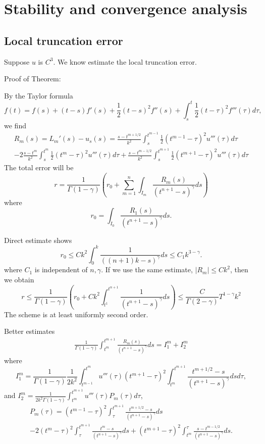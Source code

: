 \documentclass[11pt]{article} %
\begin{document}
\section{Stability and convergence analysis}


\subsection{Local truncation error}
Suppose $u$ is $C^3$. We know estimate the local truncation error.

Proof of Theorem:

By the Taylor formula $$
f(t)=f(s)+(t-s)f'(s)+\frac{1}{2}(t-s)^2f''(s)+\int_s^t\frac{1}{2}(t-\tau)^2 f'''(\tau)d\tau,
$$
we find 
\begin{multline}
R_m(s)=L_m'(s)-u_s(s)=\frac{s-t^{m+1/2}}{k^2}\int_s^{t^{m-1}}\frac{1}{2}(t^{m-1}-\tau)^2 u'''(\tau)d\tau\\
-2\frac{s-t^m}{k^2}\int_s^{t^m}\frac{1}{2}(t^m-\tau)^2 u'''(\tau)d\tau
+\frac{s-t^{m-1/2}}{k^2}\int_s^{t^{m+1}}\frac{1}{2}(t^{m+1}-\tau)^2 u'''(\tau)d\tau
\end{multline}
The total error will be $$
r=\frac{1}{\Gamma(1-\gamma)}\left(r_0+\sum_{m=1}^n\int_{I_m}\frac{R_m(s)}{(t^{n+1}-s)^{\gamma}}ds\right)
$$
where $$
r_0=\int_{I_0}\frac{R_1(s)}{(t^{n+1}-s)^{\gamma}}ds.
$$

Direct estimate shows $$
r_0\le Ck^2\int_0^k\frac{1}{((n+1)k-s)^{\gamma}}ds\le C_1k^{3-\gamma}.
$$
where $C_1$ is independent of $n,\gamma$. If we use the same estimate, $|R_m|\le Ck^2$, then we obtain $$
r\le \frac{1}{\Gamma(1-\gamma)}(r_0+Ck^2\int_{t^1}^{t^{n+1}}\frac{1}{(t^{n+1}-s)^{\gamma}}ds)\le \frac{C}{\Gamma(2-\gamma)}T^{1-\gamma}k^2
$$
The scheme is at least uniformly second order.  

Better estimates 
\begin{gather*}
\frac{1}{\Gamma(1-\gamma)}\int_{t^m}^{t^{m+1}}\frac{R_m(s)}{(t^{n+1}-s)^{\gamma}}ds=I_1^m+I_2^m
\end{gather*}
where $$
I_1^m=\frac{1}{\Gamma(1-\gamma)}\frac{1}{2k^2}\int_{t^{m-1}}^{t^{m}}
u'''(\tau)(t^{m+1}-\tau)^2\int_{t^m}^{t^{m+1}}\frac{t^{m+1/2}-s}{(t^{n+1}-s)^{\gamma}}dsd\tau,
$$
and $I_2^m=\frac{1}{2k^2\Gamma(1-\gamma)}\int_{t^m}^{t^{m+1}}u'''(\tau)P_m(\tau)d\tau$,
\begin{multline*}
P_m(\tau)=(t^{m-1}-\tau)^2\int_{\tau}^{t^{m+1}}\frac{t^{m+1/2}-s}{(t^{n+1}-s)^{\gamma}}ds\\
-2(t^m-\tau)^2\int_{\tau}^{t^{m+1}}\frac{t^{m}-s}{(t^{n+1}-s)^{\gamma}}ds
+(t^{m+1}-\tau)^2\int_{t^m}^{\tau}\frac{s-t^{m-1/2}}{(t^{n+1}-s)^{\gamma}}ds.
\end{multline*}
\end{document}
